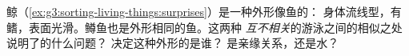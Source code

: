 \begin{exercise}[$\star\star\star$]\label{exo:g4:adapted-to-their-world:11}
鲸（\cref{ex:g3:sorting-living-things:surprises}）是一种外形像鱼的：
身体流线型，有鳍，表面光滑。鳟鱼也是外形相同的鱼。这两种
\emph{互不相关}的游泳之间的相似之处说明了的什么问题？
决定这种外形的是谁？
是亲缘关系，还是水？
\end{exercise}
